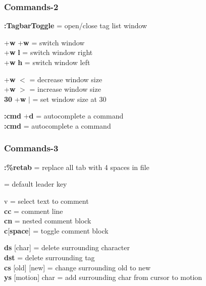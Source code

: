 \documentclass[table,dvipsnames]{beamer}
\begin{document}
	\begin{frame}
		\frametitle{Commands-2}
		\begin{exampleblock}{}
			\textbf{:TagbarToggle} = open/close tag list window
		\end{exampleblock}
		
		\begin{exampleblock}{}
			\keys{\ctrl}+\textbf{w} \keys{\ctrl}+\textbf{w} = switch window\\
			\keys{\ctrl}+\textbf{w} \textbf{l} = switch window right\\
			\keys{\ctrl}+\textbf{w} \textbf{h} = switch window left
		\end{exampleblock}
	
		\begin{exampleblock}{}
			\keys{\ctrl}+\textbf{w} \textbf{$<$} = decrease window size\\
			\keys{\ctrl}+\textbf{w} \textbf{$>$} = increase window size\\
			\textbf{30} \keys{\ctrl}+\textbf{w} \textbf{$|$} = set window size at 30
		\end{exampleblock}
		
		\begin{exampleblock}{}
			\textbf{:cmd} \keys{\ctrl}+\textbf{d} = autocomplete a command\\
			\textbf{:cmd} \keys{\tab} = autocomplete a command
		\end{exampleblock}
	
	\end{frame}

	\begin{frame}
		\frametitle{Commands-3}

		\begin{exampleblock}{}
			\textbf{:\%retab} = replace all tab with 4 spaces in file
		\end{exampleblock}
	
		\begin{exampleblock}{}
			\keys{$\backslash$} = default leader key
		\end{exampleblock}
		
		\begin{exampleblock}{}
			\Esc v = select text to comment\\
			\keys{$\backslash$}\textbf{cc} = comment line\\
			\keys{$\backslash$}\textbf{cn} = nested comment block\\
			\keys{$\backslash$}\textbf{c}[\textbf{space}] = toggle comment block
		\end{exampleblock}
	
		\begin{exampleblock}{}
			\textbf{ds} [char] = delete surrounding character\\
			\textbf{dst} = delete surrounding tag\\
			\textbf{cs} [old] [new] = change surrounding old to new\\
			\textbf{ys} [motion] char = add surrounding char from cursor to motion
		\end{exampleblock}
	\end{frame}
\end{document}
